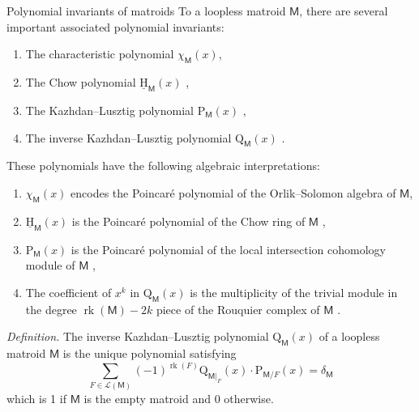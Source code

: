 \documentclass[final]{beamer}
\newlength{\onecolwid}
\DeclareMathOperator{\rk}{rk}
\newcommand{\M}{\mathsf{M}}
\newcommand{\uH}{\underline{\mathrm{H}}}
\newcommand{\cL}{\mathcal{L}}
\begin{document}
\begin{frame}[t]
\begin{columns}[t]
\begin{column}{\onecolwid} %
\vspace{-17mm}
\begin{block}{Polynomial invariants of matroids}
    To a loopless matroid $\M$, there
    are several important associated polynomial invariants:
    \begin{enumerate}[1]
        \item The characteristic polynomial \(\chi_\M(x)\),
        \item The Chow polynomial \(\uH_\M(x)\) \cite{ferroni-matherne-stevens-vecchi},
        \item The Kazhdan--Lusztig polynomial
        \(\mathrm{P}_\M(x)\) \cite{EPW16},
        \item The inverse Kazhdan--Lusztig polynomial
        \(\mathrm{Q}_\M(x)\) \cite{gao-xie}.
    \end{enumerate}
    These polynomials have the following algebraic interpretations:
    \begin{enumerate}[1']
        \item \(\chi_\M(x)\) encodes the Poincaré polynomial of the
        Orlik--Solomon algebra of \(\M\),
        \item \(\uH_\M(x)\) is the Poincaré polynomial of the Chow ring of \(\M\)
        \cite{feichtner-yuzvinsky, ferroni-matherne-stevens-vecchi},
        \item \(\mathrm{P}_\M(x)\) is the Poincaré polynomial of the local
            intersection cohomology module of $\M$
            \cite{braden-huh-matherne-proudfoot-wang},
        \item The coefficient of $x^k$ in $\mathrm{Q}_{\M}(x)$ is the
        multiplicity of the trivial module in the degree
        $\rk(\M) - 2k$ piece of the Rouquier complex of
        $\M$ \cite{braden-huh-matherne-proudfoot-wang}.
    \end{enumerate}
\end{block}
\vspace{-15mm}
\begin{alertblock}{}
    \emph{Definition.} The inverse Kazhdan--Lusztig polynomial $\mathrm{Q}_\M(x)$ 
    of a loopless matroid $\M$
    is the unique polynomial satisfying
    \[
        \sum_{F \in \cL(\M)}
        (-1)^{\rk(F)}\mathrm{Q}_{\M|_F}(x)
        \cdot \mathrm{P}_{\M/F}(x) = \delta_{\M}
    \]
    which is 1 if $\M$ is the empty matroid and 0 otherwise.
\end{alertblock}
\vspace{-15mm}

\end{column}
\end{columns}
\end{frame}
\end{document}
